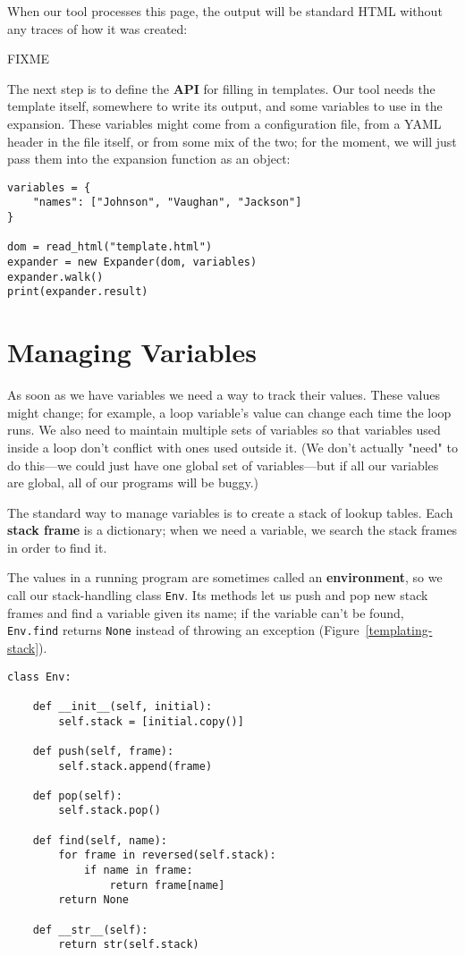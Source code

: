 \documentclass{scrbook}
\newcommand{\figref}[1]{Figure~\ref{#1}}
\newcommand{\glossref}[1]{\textbf{#1}}
\begin{document}
When our tool processes this page,
the output will be standard HTML without any traces of how it was created:


FIXME



The next step is to define the \glossref{API} for filling in templates.
Our tool needs the template itself,
somewhere to write its output,
and some variables to use in the expansion.
These variables might come from a configuration file,
from a YAML header in the file itself,
or from some mix of the two;
for the moment,
we will just pass them into the expansion function as an object:


\begin{lstlisting}[frame=single,frameround=tttt]
variables = {
    "names": ["Johnson", "Vaughan", "Jackson"]
}

dom = read_html("template.html")
expander = new Expander(dom, variables)
expander.walk()
print(expander.result)
\end{lstlisting}


\section{Managing Variables}\label{templating-values}


As soon as we have variables we need a way to track their values.
These values might change;
for example,
a loop variable's value can change each time the loop runs.
We also need to maintain multiple sets of variables
so that variables used inside a loop
don't conflict with ones used outside it.
(We don't actually "need" to do this—we could just have one global set of variables—but
if all our variables are global,
all of our programs will be buggy.)


The standard way to manage variables is to create a stack of lookup tables.
Each \glossref{stack frame} is a dictionary;
when we need a variable,
we search the stack frames in order to find it.



The values in a running program are sometimes called
an \glossref{environment},
so we call our stack-handling class \texttt{Env}.
Its methods let us push and pop new stack frames
and find a variable given its name;
if the variable can't be found,
\texttt{Env.find} returns \texttt{None} instead of throwing an exception
(\figref{templating-stack}).


\begin{lstlisting}[frame=single,frameround=tttt]
class Env:

    def __init__(self, initial):
        self.stack = [initial.copy()]

    def push(self, frame):
        self.stack.append(frame)

    def pop(self):
        self.stack.pop()

    def find(self, name):
        for frame in reversed(self.stack):
            if name in frame:
                return frame[name]
        return None

    def __str__(self):
        return str(self.stack)
\end{lstlisting}
\end{document}
